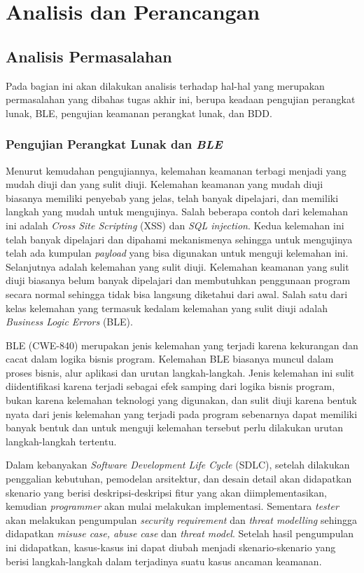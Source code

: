 \chapter{Analisis dan Perancangan}

\section{Analisis Permasalahan}

Pada bagian ini akan dilakukan analisis terhadap hal-hal yang merupakan permasalahan
yang dibahas tugas akhir ini, berupa keadaan pengujian perangkat lunak, BLE,
pengujian keamanan perangkat lunak, dan BDD.

\subsection{Pengujian Perangkat Lunak dan \textit{BLE}}

Menurut kemudahan pengujiannya, kelemahan keamanan terbagi menjadi yang mudah diuji
dan yang sulit diuji. Kelemahan keamanan yang mudah diuji biasanya memiliki penyebab
yang jelas, telah banyak dipelajari, dan memiliki langkah yang mudah untuk mengujinya.
Salah beberapa contoh dari kelemahan ini adalah \emph{Cross Site Scripting} (XSS) dan
\emph{SQL injection}. Kedua kelemahan ini telah banyak dipelajari dan dipahami mekanismenya
sehingga untuk mengujinya telah ada kumpulan \emph{payload} yang bisa digunakan untuk menguji
kelemahan ini. Selanjutnya adalah kelemahan yang sulit diuji. Kelemahan keamanan
yang sulit diuji biasanya belum banyak dipelajari dan membutuhkan penggunaan program
secara normal sehingga tidak bisa langsung diketahui dari awal. Salah satu
dari kelas kelemahan yang termasuk kedalam kelemahan yang sulit diuji adalah
\emph{Business Logic Errors} (BLE).

BLE (CWE-840) merupakan jenis kelemahan yang terjadi karena kekurangan
dan cacat dalam logika bisnis program. Kelemahan BLE biasanya muncul dalam proses bisnis,
alur aplikasi dan urutan langkah-langkah. Jenis kelemahan ini sulit diidentifikasi karena
terjadi sebagai efek samping dari logika bisnis program, bukan karena kelemahan teknologi
yang digunakan, dan sulit diuji karena bentuk nyata dari jenis kelemahan yang terjadi
pada program sebenarnya dapat memiliki banyak bentuk dan untuk menguji kelemahan tersebut
perlu dilakukan urutan langkah-langkah tertentu.

Dalam kebanyakan \textit{Software Development Life Cycle} (SDLC), setelah dilakukan
penggalian kebutuhan, pemodelan arsitektur, dan desain detail akan didapatkan
skenario yang berisi deskripsi-deskripsi fitur yang akan diimplementasikan,
kemudian \emph{programmer} akan mulai melakukan implementasi.
Sementara \emph{tester} akan melakukan
pengumpulan \emph{security requirement} dan \emph{threat modelling} sehingga didapatkan
\emph{misuse case, abuse case} dan \emph{threat model}. Setelah hasil pengumpulan ini
didapatkan, kasus-kasus ini dapat diubah menjadi skenario-skenario yang berisi
langkah-langkah dalam terjadinya suatu kasus ancaman keamanan.

